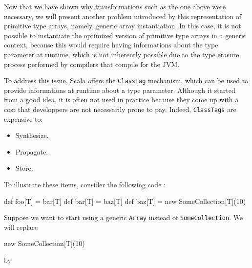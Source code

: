 
Now that we have shown why transformations such as the one above were necessary, we will present another problem introduced by this representation of primitive type arrays, namely, generic array instantiation. In this case, it is not possible to instantiate the optimized version of primitive type arrays in a generic context, because this would require having informations about the type parameter at runtime, which is not inherently possible due to the type erasure process performed by compilers that compile for the JVM. 


To address this issue, Scala offers the \lstinline|ClassTag| mechanism, which can be used to provide informations at runtime about a type parameter. Although it started from a good idea, it is often not used in practice because they come up with a cost that developpers are not necessarily prone to pay. Indeed, \lstinline|ClassTags| are expensive to:


\begin{itemize}
  \item Synthesize.
  \item Propagate.
  \item Store.
\end{itemize}

To illustrate these items, consider the following code : 

\begin{lstlisting-nobreak}
  def foo[T] = bar[T]
  def bar[T] = baz[T]
  def baz[T] = new SomeCollection[T](10)
\end{lstlisting-nobreak}

Suppose we want to start using a generic \lstinline|Array| instead of \lstinline|SomeCollection|. We will replace
 
\begin{lstlisting-nobreak} 
  new SomeCollection[T](10) 
\end{lstlisting-nobreak}

by

